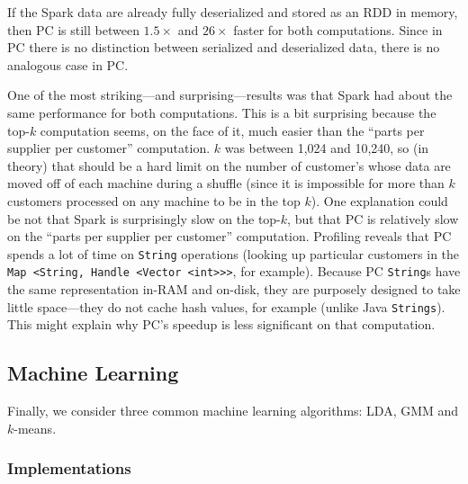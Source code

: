 If the Spark data are already
fully deserialized and stored as an RDD in memory, then PC is still 
between $1.5\times$ and $26\times$ faster
for both computations. Since in PC there is no distinction between
serialized and deserialized data, there is no analogous case in PC. 


One of the most striking---and surprising---results was that Spark had about the same performance for both computations.  This is
a bit surprising because the top-$k$ computation seems, on the face of it, much easier 
than the ``parts per supplier per customer'' computation.  $k$ was between 1,024 and 10,240, so (in theory) that should be
a hard limit on the number of customer's whose data are moved off of each machine during a shuffle 
(since it is impossible for more than $k$
customers processed on any machine to be in the top $k$).  One explanation could be not that Spark is surprisingly slow on the
top-$k$, but that PC is relatively slow on the ``parts per supplier per customer'' computation.  Profiling reveals that PC spends
a lot of time on \texttt{String} operations (looking up particular customers in the
\texttt{Map <String, Handle <Vector <int}\texttt{>}\texttt{>}\texttt{>}, for example).  
Because PC \texttt{String}s have the same representation in-RAM and on-disk, they are purposely designed to take little
space---they do not cache hash values, for example (unlike Java \texttt{Strings}).  This might explain why PC's speedup is
less significant on that computation.

\subsection {Machine Learning}

Finally, we consider three common machine learning algorithms: LDA,
GMM and $k$-means. 

\subsubsection {Implementations}

